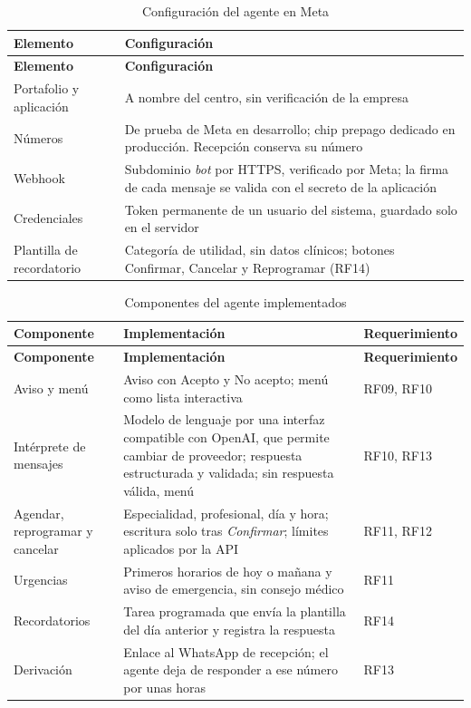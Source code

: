 \begingroup
\fontsize{9}{11}\selectfont
\renewcommand{\arraystretch}{1.2}
\setlength{\LTpre}{0pt}\setlength{\LTpost}{6pt}
\setlength{\tabcolsep}{4pt}
\begin{xltabular}{\linewidth}{|>{\raggedright\arraybackslash}p{3.4cm}|>{\raggedright\arraybackslash}X|}
\caption{Configuración del agente en Meta}
\label{tab:ob3_meta} \\
\hline
\textbf{Elemento} & \textbf{Configuración} \\ \hline
\endfirsthead
\hline
\textbf{Elemento} & \textbf{Configuración} \\ \hline
\endhead
Portafolio y aplicación & A nombre del centro, sin verificación de la empresa \\ \hline
Números & De prueba de Meta en desarrollo; chip prepago dedicado en producción. Recepción conserva su número \\ \hline
Webhook & Subdominio \textit{bot} por HTTPS, verificado por Meta; la firma de cada mensaje se valida con el secreto de la aplicación \\ \hline
Credenciales & Token permanente de un usuario del sistema, guardado solo en el servidor \\ \hline
Plantilla de recordatorio & Categoría de utilidad, sin datos clínicos; botones Confirmar, Cancelar y Reprogramar (RF14) \\ \hline
\end{xltabular}
\endgroup

\begingroup
\fontsize{9}{11}\selectfont
\renewcommand{\arraystretch}{1.2}
\setlength{\LTpre}{0pt}\setlength{\LTpost}{6pt}
\setlength{\tabcolsep}{4pt}
\begin{xltabular}{\linewidth}{|>{\raggedright\arraybackslash}p{3.4cm}|>{\raggedright\arraybackslash}X|>{\raggedright\arraybackslash}p{2.2cm}|}
\caption{Componentes del agente implementados}
\label{tab:ob3_agente} \\
\hline
\textbf{Componente} & \textbf{Implementación} & \textbf{Requerimiento} \\ \hline
\endfirsthead
\hline
\textbf{Componente} & \textbf{Implementación} & \textbf{Requerimiento} \\ \hline
\endhead
Aviso y menú & Aviso con Acepto y No acepto; menú como lista interactiva & RF09, RF10 \\ \hline
Intérprete de mensajes & Modelo de lenguaje por una interfaz compatible con OpenAI, que permite cambiar de proveedor; respuesta estructurada y validada; sin respuesta válida, menú & RF10, RF13 \\ \hline
Agendar, reprogramar y cancelar & Especialidad, profesional, día y hora; escritura solo tras \textit{Confirmar}; límites aplicados por la API & RF11, RF12 \\ \hline
Urgencias & Primeros horarios de hoy o mañana y aviso de emergencia, sin consejo médico & RF11 \\ \hline
Recordatorios & Tarea programada que envía la plantilla del día anterior y registra la respuesta & RF14 \\ \hline
Derivación & Enlace al WhatsApp de recepción; el agente deja de responder a ese número por unas horas & RF13 \\ \hline
\end{xltabular}
\endgroup

